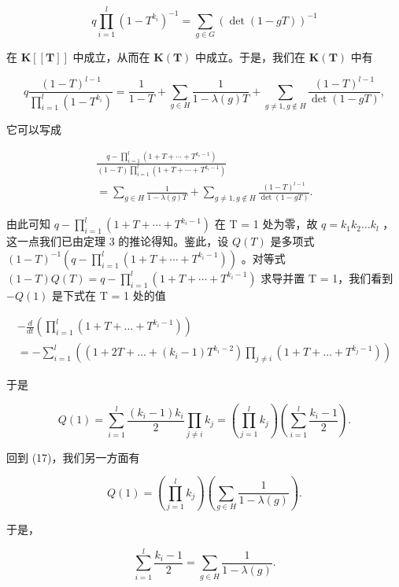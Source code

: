 \[
q \prod_ {i = 1} ^ {l} (1 - T ^ {k _ {i}}) ^ {- 1} = \sum_ {g \in G} (\det (1 - g T)) ^ {- 1}\tag{16}
\]

在 \(\mathbf{K}[[\mathbf{T}]]\) 中成立，从而在 \(\mathbf{K}(\mathbf{T})\) 中成立。于是，我们在 \(\mathbf{K}(\mathbf{T})\) 中有

\[
q \frac {(1 - T) ^ {l - 1}}{\prod_ {i = 1} ^ {l} (1 - T ^ {k _ {i}})} = \frac {1}{1 - T} + \sum_ {g \in H} \frac {1}{1 - \lambda (g) T} + \sum_ {g \neq 1, g \notin H} \frac {(1 - T) ^ {l - 1}}{\det (1 - g T)},
\]

它可以写成

\[
\begin{array}{c} \frac {q - \prod_ {i = 1} ^ {l} (1 + T + \cdots + T ^ {k _ {i} - 1})}{(1 - T) \prod_ {i = 1} ^ {l} (1 + T + \cdots + T ^ {k _ {i} - 1})} \\ = \sum_ {g \in H} \frac {1}{1 - \lambda (g) T} + \sum_ {g \neq 1, g \notin H} \frac {(1 - T) ^ {l - 1}}{\det (1 - g T)}. \end{array}\tag{17}
\]

由此可知 \(q - \prod_{i=1}^{l} (1 + T + \cdots + T^{k_i - 1})\) 在 T = 1 处为零，故 \(q = k_1 k_2 \ldots k_l\) ，这一点我们已由定理 3 的推论得知。鉴此，设 \(Q(T)\) 是多项式 \((1 - T)^{-1}(q - \prod_{i=1}^{l} (1 + T + \cdots + T^{k_i - 1}))\) 。对等式 \((1 - T)Q(T) = q - \prod_{i=1}^{l} (1 + T + \cdots + T^{k_i - 1})\) 求导并置 T = 1，我们看到 \(-Q(1)\) 是下式在 T = 1 处的值

\[
\begin{array}{l} - \frac {d}{d t} \left(\prod_ {i = 1} ^ {l} (1 + T + \dots + T ^ {k _ {i} - 1})\right) \\ = - \sum_ {i = 1} ^ {l} \left((1 + 2 T + \dots + (k _ {i} - 1) T ^ {k _ {i} - 2}) \prod_ {j \neq i} (1 + T + \dots + T ^ {k _ {j} - 1})\right) \end{array}
\]

于是

\[
Q (1) = \sum_ {i = 1} ^ {l} \frac {\left(k _ {i} - 1\right) k _ {i}}{2} \prod_ {j \neq i} k _ {j} = \left(\prod_ {j = 1} ^ {l} k _ {j}\right) \left(\sum_ {i = 1} ^ {l} \frac {k _ {i} - 1}{2}\right).
\]

回到 (17)，我们另一方面有

\[
Q (1) = \left(\prod_ {j = 1} ^ {l} k _ {j}\right) \left(\sum_ {g \in H} \frac {1}{1 - \lambda (g)}\right).
\]

于是，

\[
\sum_ {i = 1} ^ {l} \frac {k _ {i} - 1}{2} = \sum_ {g \in H} \frac {1}{1 - \lambda (g)}.\tag{18}
\]


